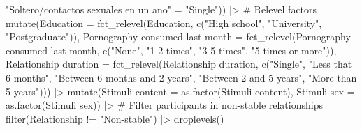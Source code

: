 \documentclass[
  bookmarksnumbered]{article}
\newenvironment{Shaded}{\begin{snugshade}}{\end{snugshade}}
\newcommand{\AttributeTok}[1]{\textcolor[rgb]{0.80,0.80,0.80}{#1}}
\newcommand{\CommentTok}[1]{\textcolor[rgb]{0.50,0.62,0.50}{#1}}
\newcommand{\FunctionTok}[1]{\textcolor[rgb]{0.94,0.94,0.56}{#1}}
\newcommand{\NormalTok}[1]{\textcolor[rgb]{0.80,0.80,0.80}{#1}}
\newcommand{\OtherTok}[1]{\textcolor[rgb]{0.94,0.94,0.56}{#1}}
\newcommand{\SpecialCharTok}[1]{\textcolor[rgb]{0.86,0.64,0.64}{#1}}
\newcommand{\StringTok}[1]{\textcolor[rgb]{0.80,0.58,0.58}{#1}}
\begin{document}
\begin{Shaded}
\begin{Highlighting}[]
                               \StringTok{"Soltero/contactos sexuales en un ano"} \OtherTok{=} \StringTok{"Single"}\NormalTok{)) }\SpecialCharTok{|\textgreater{}}
  \CommentTok{\# Relevel factors}
  \FunctionTok{mutate}\NormalTok{(}\AttributeTok{Education =} \FunctionTok{fct\_relevel}\NormalTok{(Education, }
                                 \FunctionTok{c}\NormalTok{(}\StringTok{"High school"}\NormalTok{, }\StringTok{"University"}\NormalTok{, }\StringTok{"Postgraduate"}\NormalTok{)),}
         \StringTok{\textasciigrave{}}\AttributeTok{Pornography consumed last month}\StringTok{\textasciigrave{}} \OtherTok{=} \FunctionTok{fct\_relevel}\NormalTok{(}\StringTok{\textasciigrave{}}\AttributeTok{Pornography consumed last month}\StringTok{\textasciigrave{}}\NormalTok{,}
                                 \FunctionTok{c}\NormalTok{(}\StringTok{"None"}\NormalTok{, }\StringTok{"1{-}2 times"}\NormalTok{, }
                                   \StringTok{"3{-}5 times"}\NormalTok{, }\StringTok{"5 times or more"}\NormalTok{)),}
         \StringTok{\textasciigrave{}}\AttributeTok{Relationship duration}\StringTok{\textasciigrave{}} \OtherTok{=} \FunctionTok{fct\_relevel}\NormalTok{(}\StringTok{\textasciigrave{}}\AttributeTok{Relationship duration}\StringTok{\textasciigrave{}}\NormalTok{,}
                                 \FunctionTok{c}\NormalTok{(}\StringTok{"Single"}\NormalTok{, }\StringTok{"Less that 6 months"}\NormalTok{,}
                                   \StringTok{"Between 6 months and 2 years"}\NormalTok{,}
                                   \StringTok{"Between 2 and 5 years"}\NormalTok{,}
                                   \StringTok{"More than 5 years"}\NormalTok{))) }\SpecialCharTok{|\textgreater{}} 
  \FunctionTok{mutate}\NormalTok{(}\StringTok{\textasciigrave{}}\AttributeTok{Stimuli content}\StringTok{\textasciigrave{}} \OtherTok{=} \FunctionTok{as.factor}\NormalTok{(}\StringTok{\textasciigrave{}}\AttributeTok{Stimuli content}\StringTok{\textasciigrave{}}\NormalTok{),}
         \StringTok{\textasciigrave{}}\AttributeTok{Stimuli sex}\StringTok{\textasciigrave{}} \OtherTok{=} \FunctionTok{as.factor}\NormalTok{(}\StringTok{\textasciigrave{}}\AttributeTok{Stimuli sex}\StringTok{\textasciigrave{}}\NormalTok{)) }\SpecialCharTok{|\textgreater{}} 
  \CommentTok{\# Filter participants in non{-}stable relationships}
  \FunctionTok{filter}\NormalTok{(Relationship }\SpecialCharTok{!=} \StringTok{"Non{-}stable"}\NormalTok{) }\SpecialCharTok{|\textgreater{}}
  \FunctionTok{droplevels}\NormalTok{()}
\end{Highlighting}
\end{Shaded}
\end{document}
